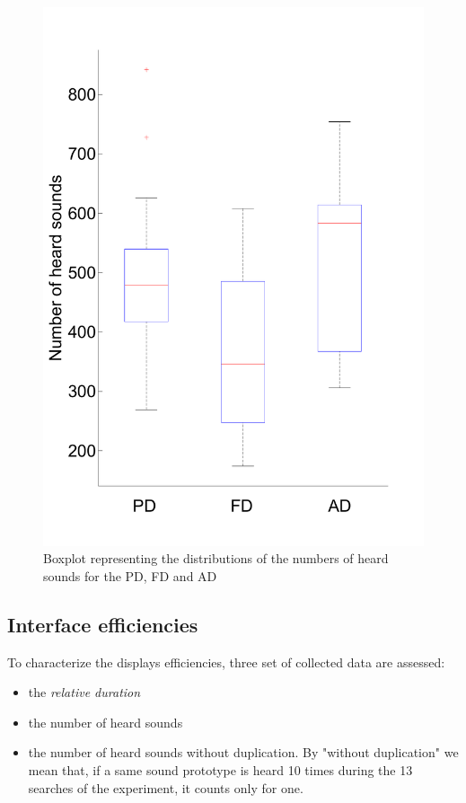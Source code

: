 \documentclass{aes2e}
\begin{document}
\begin{figure}[t]
\begin{center}
\includegraphics[scale=0.36]{gfx/NBRbis.pdf} 
\end{center}
\caption{\label{fig2} Boxplot representing the distributions of the numbers of heard sounds for the PD, FD and AD}
\end{figure}


\subsection{Interface efficiencies}

To characterize the displays efficiencies, three set of collected data are assessed: 
\begin{itemize}
\item the \textit{relative duration} 
\item the number of heard sounds 
\item the number of heard sounds without duplication. By "without duplication" we mean that, if a same sound prototype is heard 10 times during the 13 searches of the  experiment, it counts only for one. 
\end{itemize}
\end{document}
